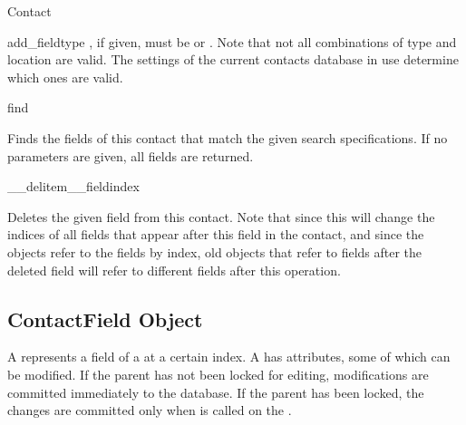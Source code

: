 \begin{classdesc*}{Contact}
\begin{methoddesc}[Contact]{add_field}{type }
, if given, must be  or 
. Note that not all combinations of type and location are 
valid. The settings of the current contacts database in use determine which 
ones are valid. 

\end{methoddesc}

\begin{methoddesc}[Contact]{find}{}

Finds the fields of this contact that match the given search specifications. 
If no parameters are given, all fields are returned.

\end{methoddesc}

\begin{methoddesc}[Contact]{__delitem__}{fieldindex}

Deletes the given field from this contact. Note that since this will change 
the indices of all fields that appear after this field in the contact, and 
since the  objects refer to the fields by index, old 
objects that refer to fields after the deleted field 
will refer to different fields after this operation.

\end{methoddesc}

\end{classdesc*}

\subsection{ContactField Object}
\label{subsec:contactfield}

A  represents a field of a  at a 
certain index. A  has attributes, some of which can be 
modified. If the parent  has not been locked for editing, 
modifications are committed immediately to the database. If the parent 
 has been locked, the changes are committed only when 
 is called on the .

